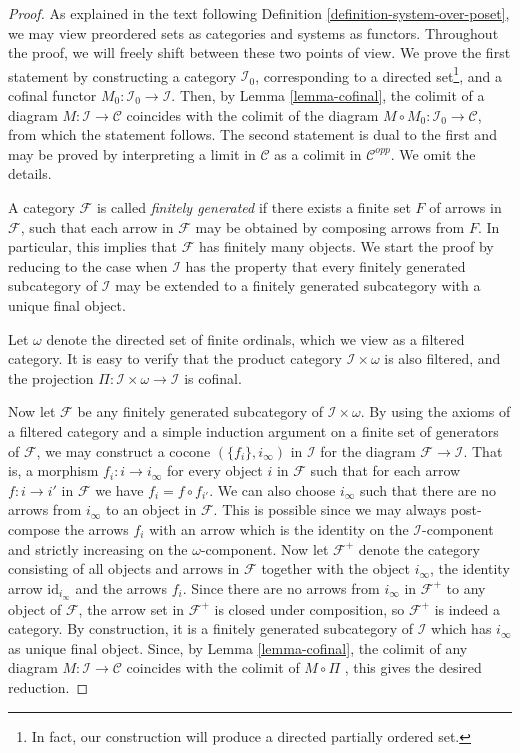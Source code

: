 \begin{proof}
As explained in the text following
Definition \ref{definition-system-over-poset}, we may view
preordered sets as categories and systems as functors.
Throughout the proof, we will freely shift between these two points of view.
We prove the first statement by constructing a category
$\mathcal{I}_0$, corresponding to a directed set\footnote{In fact,
our construction will produce a directed partially ordered set.}, and a cofinal
functor $M_0 : \mathcal{I}_0 \to \mathcal{I}$. Then, by
Lemma \ref{lemma-cofinal}, the colimit of a diagram
$M : \mathcal{I} \to \mathcal{C}$ coincides with the
colimit of the diagram $M \circ M_0 : \mathcal{I}_0 \to \mathcal{C}$,
from which the statement follows. The second statement is dual to the
first and may be proved by interpreting a limit in $\mathcal{C}$ as
a colimit in $\mathcal{C}^{opp}$. We omit the details.

\medskip\noindent
A category $\mathcal{F}$ is called {\em finitely generated} if
there exists a finite set $F$ of arrows in $\mathcal{F}$, such that
each arrow in $\mathcal{F}$ may be obtained by composing
arrows from $F$. In particular, this implies that $\mathcal{F}$ has
finitely many objects. We start the proof by reducing to the case
when $\mathcal{I}$ has the property that every finitely generated
subcategory of $\mathcal{I}$ may be extended to a finitely
generated subcategory with a unique final object.

\medskip\noindent
Let $\omega$ denote the directed set of finite ordinals, which
we view as a filtered category. It is easy to verify that the
product category $\mathcal{I}\times \omega$ is also filtered,
and the projection
$\Pi : \mathcal{I} \times \omega \to \mathcal{I}$
is cofinal.

\medskip\noindent
Now let $\mathcal{F}$ be any finitely generated
subcategory of $\mathcal{I}\times \omega$.
By using the axioms of a filtered category and a simple induction
argument on a finite set of generators of $\mathcal{F}$,
we may construct a cocone $(\{f_i\}, i_\infty)$ in $\mathcal{I}$
for the diagram $\mathcal{F} \to \mathcal{I}$. That is, a morphism
$f_i : i \to i_\infty$ for every object $i$ in $\mathcal{F}$
such that for each arrow $f : i \to i'$ in $\mathcal{F}$
we have $f_i = f\circ f_{i'}$. We can also choose $i_\infty$ such
that there are no arrows from $i_\infty$ to an object in $\mathcal{F}$.
This is possible since
we may always post-compose the arrows $f_i$ with an arrow
which is the identity on the $\mathcal{I}$-component and
strictly increasing on the $\omega$-component.
Now let $\mathcal{F}^+$ denote the category consisting of all
objects and arrows in $\mathcal{F}$
together with the object $i_\infty$, the identity
arrow $\text{id}_{i_\infty}$ and the arrows $f_i$.
Since there are no arrows from $i_\infty$ in $\mathcal{F}^+$
to any object of $\mathcal{F}$, the arrow set in $\mathcal{F}^+$
is closed under composition, so $\mathcal{F}^+$ is indeed
a category. By construction, it is a finitely
generated subcategory of $\mathcal{I}$ which has $i_\infty$ as
unique final object. Since, by Lemma \ref{lemma-cofinal},
the colimit of  any diagram $M : \mathcal{I} \to \mathcal{C}$
coincides with the colimit of $M\circ\Pi$ , this gives the desired
reduction.


\end{proof}
